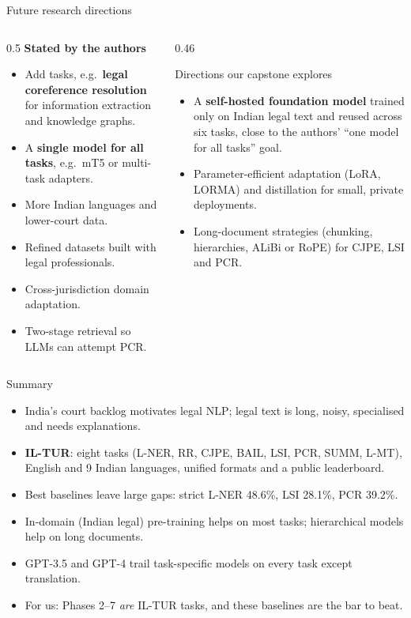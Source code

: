 \documentclass[aspectratio=169,11pt]{beamer}
\begin{document}
\begin{frame}{Future research directions}
  \begin{columns}[T]
    \begin{column}{0.5\textwidth}
      \small
      \textbf{Stated by the authors}
      \begin{itemize}
        \item Add tasks, e.g.\ \textbf{legal coreference resolution} for information extraction and knowledge graphs.
        \item A \textbf{single model for all tasks}, e.g.\ mT5 or multi-task adapters.
        \item More Indian languages and lower-court data.
        \item Refined datasets built with legal professionals.
        \item Cross-jurisdiction domain adaptation.
        \item Two-stage retrieval so LLMs can attempt PCR.
      \end{itemize}
    \end{column}
    \begin{column}{0.46\textwidth}
      \begin{block}{Directions our capstone explores}
        \small
        \begin{itemize}
          \item A \textbf{self-hosted foundation model} trained only on Indian legal text and reused across six tasks, close to the authors' ``one model for all tasks'' goal.
          \item Parameter-efficient adaptation (LoRA, LORMA) and distillation for small, private deployments.
          \item Long-document strategies (chunking, hierarchies, ALiBi or RoPE) for CJPE, LSI and PCR.
        \end{itemize}
      \end{block}
    \end{column}
  \end{columns}
\end{frame}

\begin{frame}{Summary}
  \begin{itemize}
    \item India's court backlog motivates legal NLP; legal text is long, noisy, specialised and needs explanations.
    \item \textbf{IL-TUR}: eight tasks (L-NER, RR, CJPE, BAIL, LSI, PCR, SUMM, L-MT), English and 9 Indian languages, unified formats and a public leaderboard.
    \item Best baselines leave large gaps: strict L-NER 48.6\%, LSI 28.1\%, PCR 39.2\%.
    \item In-domain (Indian legal) pre-training helps on most tasks; hierarchical models help on long documents.
    \item GPT-3.5 and GPT-4 trail task-specific models on every task except translation.
    \item For us: Phases 2--7 \emph{are} IL-TUR tasks, and these baselines are the bar to beat.
  \end{itemize}
\end{frame}
\end{document}
